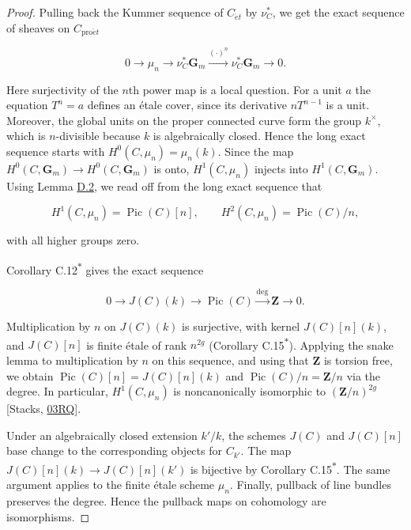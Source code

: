 \documentclass[11pt]{article}
\newcommand{\bpout}[1]{#1\textsuperscript{\hyperlink{bp-outside}{\ensuremath{\ast}}}}
\begin{document}
\begin{proof}[{Proof}]\label{bp11}%
Pulling back the Kummer sequence of \(C_{\acute{e}t}\) by \(\nu_C^*\), we get the exact sequence of sheaves on \(C_{\mathrm{pro}\acute{e}t}\)

\[
0\longrightarrow\mu_n\longrightarrow\nu_C^*\mathbf G_m
\xrightarrow{(\cdot)^n}\nu_C^*\mathbf G_m
\longrightarrow0.
\]

Here surjectivity of the \(n\)th power map is a local question. For a unit \(a\) the equation \(T^n=a\) defines an étale cover, since its derivative \(nT^{n-1}\) is a unit. Moreover, the global units on the proper connected curve form the group \(k^\times\), which is \(n\)-divisible because \(k\) is algebraically closed. Hence the long exact sequence starts with \(H^0(C,\mu_n)=\mu_n(k)\). Since the map \(H^0(C,\mathbf G_m)\to H^0(C,\mathbf G_m)\) is onto, \(H^1(C,\mu_n)\) injects into \(H^1(C,\mathbf G_m)\). Using Lemma \hyperref[bp7]{D.2}, we read off from the long exact sequence that

\[
H^1(C,\mu_n)=\operatorname{Pic}(C)[n],\qquad
H^2(C,\mu_n)=\operatorname{Pic}(C)/n,
\]

with all higher groups zero.

Corollary \bpout{C.12} gives the exact sequence

\[
0\longrightarrow J(C)(k)\longrightarrow\operatorname{Pic}(C)
\xrightarrow{\deg}\mathbf Z\longrightarrow0.
\]

Multiplication by \(n\) on \(J(C)(k)\) is surjective, with kernel \(J(C)[n](k)\), and \(J(C)[n]\) is finite étale of rank \(n^{2g}\) (Corollary \bpout{C.15}).  Applying the snake lemma to multiplication by \(n\) on this sequence, and using that \(\mathbf Z\) is torsion free, we obtain \(\operatorname{Pic}(C)[n]=J(C)[n](k)\) and \(\operatorname{Pic}(C)/n=\mathbf Z/n\) via the degree. In particular, \(H^1(C,\mu_n)\) is noncanonically isomorphic to \((\mathbf Z/n)^{2g}\) [Stacks, \href{https://stacks.math.columbia.edu/tag/03RQ}{03RQ}].

Under an algebraically closed extension \(k'/k\), the schemes \(J(C)\) and \(J(C)[n]\) base change to the corresponding objects for \(C_{k'}\). The map \(J(C)[n](k)\to J(C)[n](k')\) is bijective by Corollary \bpout{C.15}. The same argument applies to the finite étale scheme \(\mu_n\). Finally, pullback of line bundles preserves the degree. Hence the pullback maps on cohomology are isomorphisms.
\end{proof}
\end{document}
